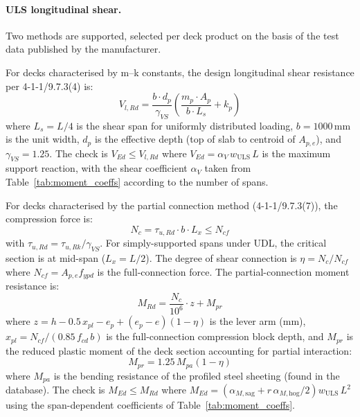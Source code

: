\paragraph{ULS longitudinal shear.} Two methods are supported, selected per deck product on the basis of the test data published by the manufacturer.

For decks characterised by m--k constants, the design longitudinal shear resistance per 4-1-1/9.7.3(4) is:
\begin{equation}
    V_{l,Rd} = \frac{b \cdot d_p}{\gamma_{VS}} \left( \frac{m_p \cdot A_p}{b \cdot L_s} + k_p \right)
    \label{eq:mk}
\end{equation}
where $L_s = L/4$ is the shear span for uniformly distributed loading, $b = 1000$\,mm is the unit width, $d_p$ is the effective depth (top of slab to centroid of $A_{p,e}$), and $\gamma_{VS} = 1.25$. The check is $V_{Ed} \le V_{l,Rd}$ where $V_{Ed} = \alpha_V\, w_\mathrm{ULS}\, L$ is the maximum support reaction, with the shear coefficient $\alpha_V$ taken from Table~\ref{tab:moment_coeffs} according to the number of spans.

For decks characterised by the partial connection method (4-1-1/9.7.3(7)), the compression force is:
\begin{equation}
    N_{c} = \tau_{u,Rd} \cdot b \cdot L_x \leq N_{cf}
    \label{eq:partial}
\end{equation}
with $\tau_{u,Rd} = \tau_{u,Rk}/\gamma_{VS}$. For simply-supported spans under UDL, the critical section is at mid-span ($L_x = L/2$). The degree of shear connection is $\eta = N_c/N_{cf}$ where $N_{cf} = A_{p,e} f_{ypd}$ is the full-connection force. The partial-connection moment resistance is:
\begin{equation}
    M_{Rd} = \frac{N_c}{10^6} \cdot z + M_{pr}
    \label{eq:partial_mrd}
\end{equation}
where $z = h - 0.5\,x_{pl} - e_p + (e_p - e)(1 - \eta)$ is the lever arm (mm), $x_{pl} = N_{cf}/(0.85\,f_{cd}\,b)$ is the full-connection compression block depth, and $M_{pr}$ is the reduced plastic moment of the deck section accounting for partial interaction:
\begin{equation}
    M_{pr} = 1.25\,M_{pa}(1 - \eta)
    \label{eq:mpr}
\end{equation}
where $M_{pa}$ is the bending resistance of the profiled steel sheeting (found in the database). The check is $M_{Ed} \le M_{Rd}$ where $M_{Ed} = \left(\alpha_{M,\mathrm{sag}} + r\,\alpha_{M,\mathrm{hog}}/2\right) w_\mathrm{ULS}\, L^2$ using the span-dependent coefficients of Table~\ref{tab:moment_coeffs}.

